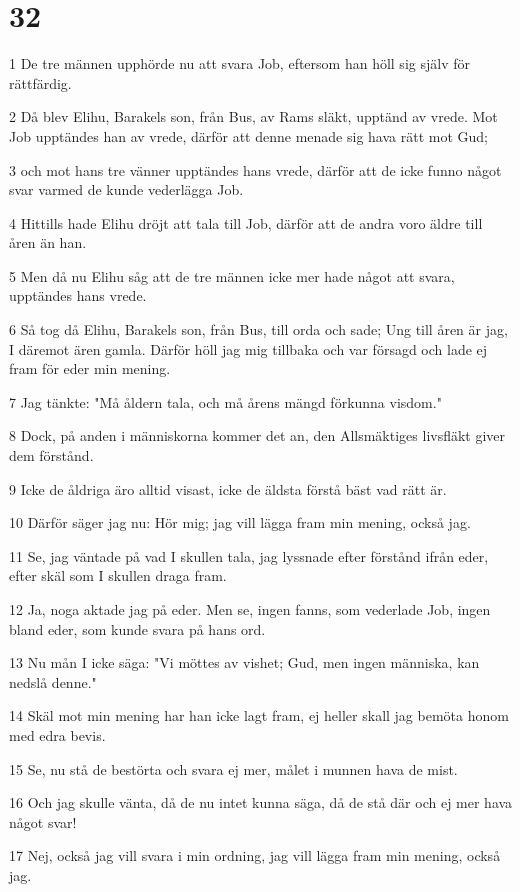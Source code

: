 \chapter{32}

\par 1 De tre männen upphörde nu att svara Job, eftersom han höll sig själv för rättfärdig.
\par 2 Då blev Elihu, Barakels son, från Bus, av Rams släkt, upptänd av vrede. Mot Job upptändes han av vrede, därför att denne menade sig hava rätt mot Gud;
\par 3 och mot hans tre vänner upptändes hans vrede, därför att de icke funno något svar varmed de kunde vederlägga Job.
\par 4 Hittills hade Elihu dröjt att tala till Job, därför att de andra voro äldre till åren än han.
\par 5 Men då nu Elihu såg att de tre männen icke mer hade något att svara, upptändes hans vrede.
\par 6 Så tog då Elihu, Barakels son, från Bus, till orda och sade; Ung till åren är jag, I däremot ären gamla. Därför höll jag mig tillbaka och var försagd och lade ej fram för eder min mening.
\par 7 Jag tänkte: "Må åldern tala, och må årens mängd förkunna visdom."
\par 8 Dock, på anden i människorna kommer det an, den Allsmäktiges livsfläkt giver dem förstånd.
\par 9 Icke de åldriga äro alltid visast, icke de äldsta förstå bäst vad rätt är.
\par 10 Därför säger jag nu: Hör mig; jag vill lägga fram min mening, också jag.
\par 11 Se, jag väntade på vad I skullen tala, jag lyssnade efter förstånd ifrån eder, efter skäl som I skullen draga fram.
\par 12 Ja, noga aktade jag på eder. Men se, ingen fanns, som vederlade Job, ingen bland eder, som kunde svara på hans ord.
\par 13 Nu mån I icke säga: "Vi möttes av vishet; Gud, men ingen människa, kan nedslå denne."
\par 14 Skäl mot min mening har han icke lagt fram, ej heller skall jag bemöta honom med edra bevis.
\par 15 Se, nu stå de bestörta och svara ej mer, målet i munnen hava de mist.
\par 16 Och jag skulle vänta, då de nu intet kunna säga, då de stå där och ej mer hava något svar!
\par 17 Nej, också jag vill svara i min ordning, jag vill lägga fram min mening, också jag.
